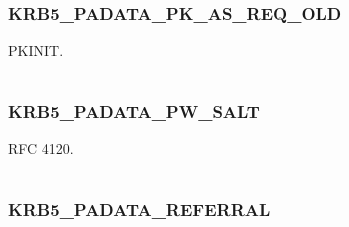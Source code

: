 \documentclass[letterpaper,10pt,english]{sphinxmanual}
\begin{document}
\subsubsection{KRB5\_PADATA\_PK\_AS\_REQ\_OLD}
\label{appdev/refs/macros/KRB5_PADATA_PK_AS_REQ_OLD:krb5-padata-pk-as-req-old}\label{appdev/refs/macros/KRB5_PADATA_PK_AS_REQ_OLD:krb5-padata-pk-as-req-old-data}\label{appdev/refs/macros/KRB5_PADATA_PK_AS_REQ_OLD::doc}

\begin{fulllineitems}
\label{appdev/refs/macros/KRB5_PADATA_PK_AS_REQ_OLD:KRB5_PADATA_PK_AS_REQ_OLD}
\end{fulllineitems}


PKINIT.

\begin{tabulary}{\linewidth}{|L|L|}
\hline

 & 
\\\hline
\end{tabulary}



\subsubsection{KRB5\_PADATA\_PW\_SALT}
\label{appdev/refs/macros/KRB5_PADATA_PW_SALT:krb5-padata-pw-salt-data}\label{appdev/refs/macros/KRB5_PADATA_PW_SALT:krb5-padata-pw-salt}\label{appdev/refs/macros/KRB5_PADATA_PW_SALT::doc}

\begin{fulllineitems}
\label{appdev/refs/macros/KRB5_PADATA_PW_SALT:KRB5_PADATA_PW_SALT}
\end{fulllineitems}


RFC 4120.

\begin{tabulary}{\linewidth}{|L|L|}
\hline

 & 
\\\hline
\end{tabulary}



\subsubsection{KRB5\_PADATA\_REFERRAL}
\label{appdev/refs/macros/KRB5_PADATA_REFERRAL:krb5-padata-referral}\label{appdev/refs/macros/KRB5_PADATA_REFERRAL::doc}\label{appdev/refs/macros/KRB5_PADATA_REFERRAL:krb5-padata-referral-data}
\end{document}
